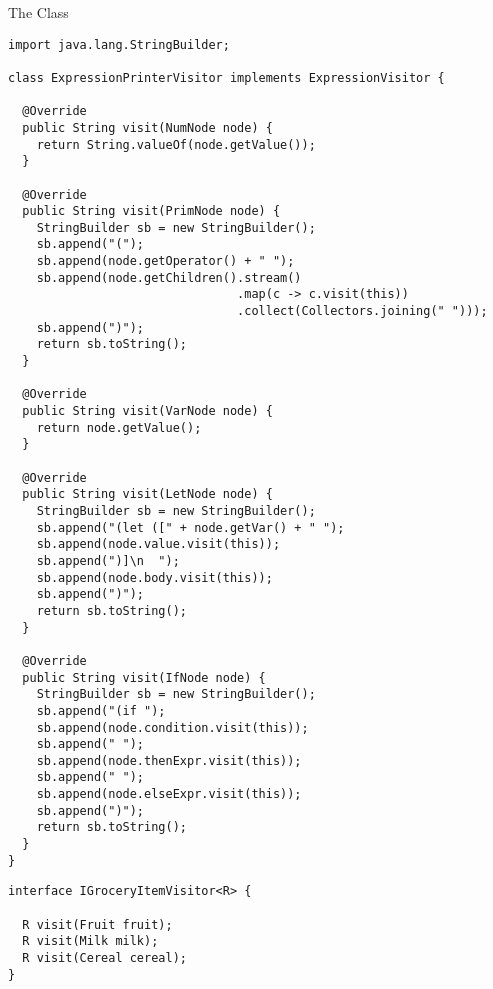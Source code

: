 \begin{cl}[]{The  Class}
\begin{lstlisting}[language=MyJava]
import java.lang.StringBuilder; 

class ExpressionPrinterVisitor implements ExpressionVisitor {

  @Override
  public String visit(NumNode node) {
    return String.valueOf(node.getValue());
  }
  
  @Override
  public String visit(PrimNode node) {
    StringBuilder sb = new StringBuilder();
    sb.append("(");
    sb.append(node.getOperator() + " ");
    sb.append(node.getChildren().stream()
                                .map(c -> c.visit(this))
                                .collect(Collectors.joining(" ")));
    sb.append(")");
    return sb.toString();
  }
  
  @Override
  public String visit(VarNode node) {
    return node.getValue();
  }
  
  @Override
  public String visit(LetNode node) {
    StringBuilder sb = new StringBuilder();
    sb.append("(let ([" + node.getVar() + " ");
    sb.append(node.value.visit(this));
    sb.append(")]\n  ");
    sb.append(node.body.visit(this));
    sb.append(")");
    return sb.toString();
  }
  
  @Override
  public String visit(IfNode node) {
    StringBuilder sb = new StringBuilder();
    sb.append("(if ");
    sb.append(node.condition.visit(this));
    sb.append(" ");
    sb.append(node.thenExpr.visit(this));
    sb.append(" ");
    sb.append(node.elseExpr.visit(this));
    sb.append(")");
    return sb.toString();
  }
}
\end{lstlisting}
\end{cl}


\begin{cl}[]{}
\begin{lstlisting}[language=MyJava]
interface IGroceryItemVisitor<R> {

  R visit(Fruit fruit);
  R visit(Milk milk);
  R visit(Cereal cereal);
}
\end{lstlisting}
\end{cl}

